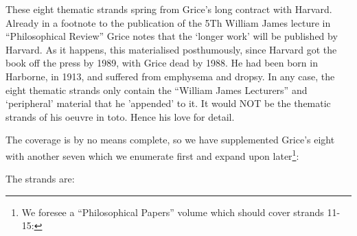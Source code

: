 \documentclass[10pt,titlepage]{book}
\begin{document}
These eight thematic strands spring from Grice's long contract with Harvard.
Already in a footnote to the publication of the 5Th William James lecture in ``Philosophical Review'' Grice notes that the `longer work' will be published by Harvard.
As it happens, this materialised posthumously, since Harvard got the book off the press by 1989, with Grice dead by 1988.
He had been born in Harborne, in 1913, and suffered from emphysema and dropsy.
In any case, the eight thematic strands only contain the ``William James Lecturers'' and `peripheral' material that he 'appended' to it.
It would NOT be the thematic strands of his oeuvre in toto.
Hence his love for detail.

The coverage is by no means complete, so we have supplemented Grice's eight with another seven which we enumerate first and expand upon later\footnote{
We foresee a ``Philosophical Papers'' volume which should cover strands 11-15:
}:

The strands are:
\end{document}
